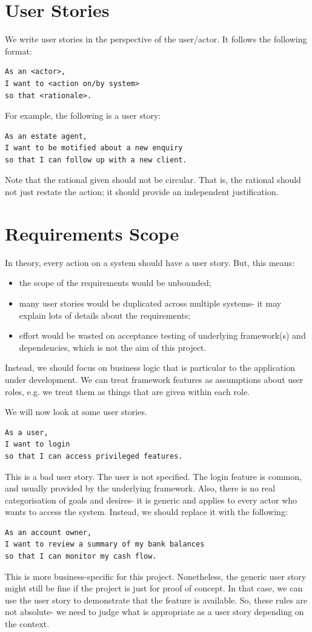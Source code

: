 \documentclass[a4paper, openany]{memoir}
\begin{document}
\section{User Stories}
We write user stories in the perspective of the user/actor. It follows the following format:
\begin{verbatim}
As an <actor>,
I want to <action on/by system> 
so that <rationale>.
\end{verbatim}
For example, the following is a user story:
\begin{verbatim}
As an estate agent,
I want to be motified about a new enquiry
so that I can follow up with a new client.
\end{verbatim}
Note that the rational given should not be circular. That is, the rational should not just restate the action; it should provide an independent justification.

\section{Requirements Scope}
In theory, every action on a system should have a user story. But, this means:
\begin{itemize}
    \item the scope of the requirements would be unbounded;
    \item many user stories would be duplicated across multiple systems- it may explain lots of details about the requirements;
    \item effort would be wasted on acceptance testing of underlying framework(s) and dependencies, which is not the aim of this project.
\end{itemize}
Instead, we should focus on business logic that is particular to the application under development. We can treat framework features as assumptions about user roles, e.g. we treat them as things that are given within each role.

We will now look at some user stories.
\begin{verbatim}
As a user,
I want to login
so that I can access privileged features.
\end{verbatim}
This is a bad user story. The user is not specified. The login feature is common, and usually provided by the underlying framework. Also, there is no real categorisation of goals and desires- it is generic and applies to every actor who wants to access the system. Instead, we should replace it with the following:
\begin{verbatim}
As an account owner,
I want to review a summary of my bank balances
so that I can monitor my cash flow.
\end{verbatim}
This is more business-specific for this project. Nonetheless, the generic user story might still be fine if the project is just for proof of concept. In that case, we can use the user story to demonstrate that the feature is available. So, these rules are not absolute- we need to judge what is appropriate as a user story depending on the context.
\end{document}

